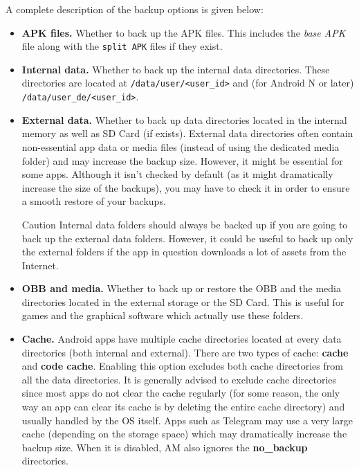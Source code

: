 A complete description of the backup options is given below:
\begin{itemize}
    \item \textbf{APK files.} Whether to back up the APK files.
    This includes the \textit{base APK} file along with the \texttt{split APK} files if they exist.

    \item \textbf{Internal data.} Whether to back up the internal data directories.
    These directories are located at \texttt{/data/user/<user\_id>} and (for Android N or later) \texttt{/data/user\_de/<user\_id>}.

    \item \textbf{External data.} Whether to back up data directories located in the internal memory as well as SD Card (if exists).
    External data directories often contain non-essential app data or media files (instead of using the dedicated media folder) and may increase the backup size.
    However, it might be essential for some apps.
    Although it isn't checked by default (as it might dramatically increase the size of the backups), you may have to check it in order to ensure a smooth restore of your backups.
    \begin{warning}{Caution}
        Internal data folders should always be backed up if you are going to back up the external data folders.
        However, it could be useful to back up only the external folders if the app in question downloads a lot of assets from the Internet.
    \end{warning}

    \item \textbf{OBB and media.} Whether to back up or restore the OBB and the media directories located in the
    external storage or the SD Card.
    This is useful for games and the graphical software which actually use these folders.

    \item \textbf{Cache.} Android apps have multiple cache directories located at every data directories (both internal and external).
    There are two types of cache: \textbf{cache} and \textbf{code cache}.
    Enabling this option excludes both cache directories from all the data directories.
    It is generally advised to exclude cache directories since most apps do not clear the cache regularly (for some
    reason, the only way an app can clear its cache is by deleting the entire cache directory) and usually handled by the OS itself.
    Apps such as Telegram may use a very large cache (depending on the storage space) which may dramatically increase the backup size.
    When it is disabled, AM also ignores the \textbf{no\_backup} directories.


\end{itemize}
